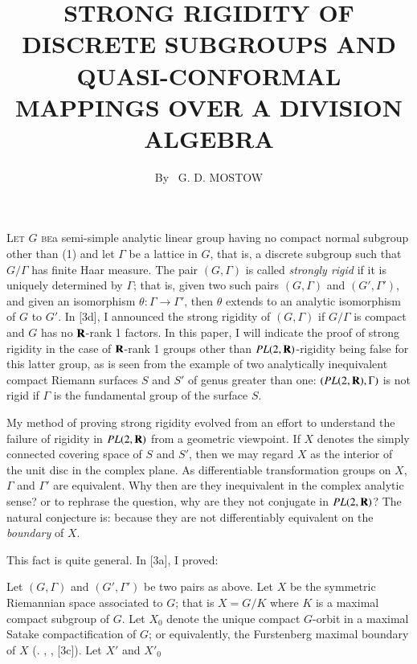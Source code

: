 
\title{STRONG RIGIDITY OF DISCRETE SUBGROUPS AND QUASI-CONFORMAL MAPPINGS OVER A DIVISION ALGEBRA}

\author{By~ G. D. MOSTOW}

\date{}
\maketitle


\setcounter{pageoriginal}{202}

\textsc{Let $G$ be}\pageoriginale a semi-simple analytic linear group having no compact normal subgroup other than (1) and let $\Gamma$ be a lattice in $G$, that is, a discrete subgroup such that $G/\Gamma$ has finite Haar measure. The pair $(G, \Gamma)$ is called \textit{strongly rigid} if it is uniquely determined by $\Gamma$; that is, given two such pairs $(G, \Gamma)$  and $(G',\Gamma')$, and given an isomorphism $\theta: \Gamma \to \Gamma'$, then $\theta$ extends to an analytic isomorphism of $G$ to $G'$. In [3d], I announced the strong rigidity of $(G,\Gamma)$ if $G/\Gamma$ is compact and $G$ has no $\mathbf{R}$-rank 1 factors. In this paper, I will indicate the proof of strong rigidity in the case of $\mathbf{R}$-rank 1 groups other than $PL (2, \mathbf{R})$-rigidity being false for this latter group, as is seen from the example of two analytically inequivalent compact Riemann surfaces $S$ and $S'$ of genus greater than one: $(PL (2, \mathbf{R}), \Gamma)$ is not rigid if $\Gamma$ is the fundamental group of the surface $S$.

My method of proving strong rigidity evolved from an effort to understand the failure of rigidity in $PL(2, \mathbf{R})$ from a geometric viewpoint. If $X$ denotes the simply connected covering space of $S$ and $S'$, then we may regard $X$ as the interior of the unit disc in the complex plane. As differentiable transformation groups on $X$, $\Gamma$ and $\Gamma'$ are equivalent. Why then are they inequivalent in the complex analytic sense? or to rephrase the question, why are they not conjugate in $PL (2,\mathbf{R})$? The natural conjecture is: because they are not differentiably equivalent on the \textit{boundary} of $X$.

This fact is quite general. In [3a], I proved:

Let $(G,\Gamma)$ and $(G', \Gamma')$ be two pairs as above. Let $X$ be the symmetric Riemannian space associated to $G$; that is $X = G/ K$ where $K$ is a maximal compact subgroup of $G$. Let $X_0$ denote the unique compact $G$-orbit in a maximal Satake compactification of $G$; or equivalently, the Furstenberg maximal boundary of $X$ (\cf. \cite{art7-key1}, \cite{art7-key5}, [3c]). Let $X'$ and $X'_0$\pageoriginale








